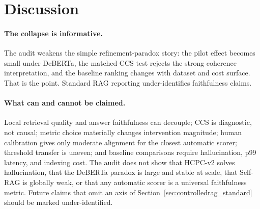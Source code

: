\section{Discussion}
\label{sec:discussion}

\paragraph{The collapse is informative.}
The audit weakens the simple refinement-paradox story: the pilot effect becomes
small under DeBERTa, the matched CCS test rejects the strong coherence
interpretation, and the baseline ranking changes with dataset and cost surface.
That is the point. Standard RAG reporting under-identifies faithfulness claims.

\paragraph{What can and cannot be claimed.}
Local retrieval quality and answer faithfulness can decouple; CCS is diagnostic,
not causal; metric choice materially changes intervention magnitude; human
calibration gives only moderate alignment for the closest automatic scorer;
threshold transfer is uneven; and baseline comparisons require hallucination,
p99 latency, and indexing cost. The audit does not show that HCPC-v2 solves
hallucination, that the DeBERTa paradox is large and stable at scale, that
Self-RAG is globally weak, or that any automatic scorer is a universal
faithfulness metric. Future claims that omit an axis of
Section~\ref{sec:controlledrag_standard} should be marked under-identified.

